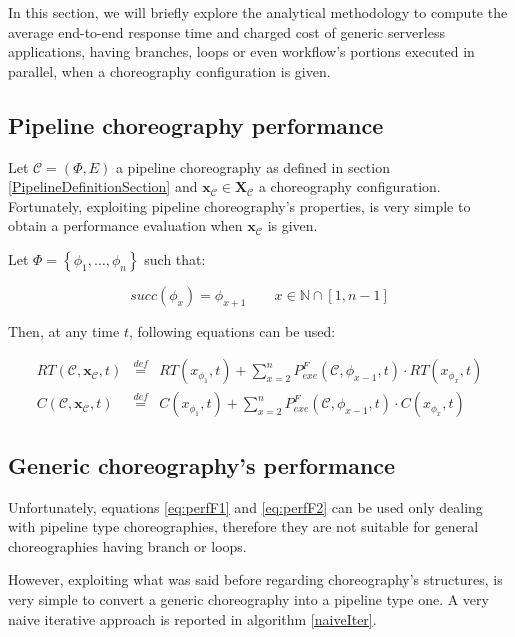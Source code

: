\documentclass[12pt,a4paper]{report}
\newcommand{\mathDef}{\overset{\textit{def}}{=}}
\newcommand{\N}{\mathbb{N}}
\newcommand{\SetFromOneTo}[1]{\N \cap \left[1,#1\right]}
\begin{document}
In this section, we will briefly explore the analytical methodology to compute the average end-to-end response time and charged cost of generic serverless applications, having branches, loops or even workflow's portions executed in parallel, when a choreography configuration is given.

\subsection{Pipeline choreography performance}

Let $\mathcal{C} = (\Phi,E)$ a pipeline choreography as defined in section \ref{PipelineDefinitionSection} and $\textbf{x}_{\mathcal{C}} \in \textbf{X}_{\mathcal{C}}$ a choreography configuration. Fortunately, exploiting pipeline choreography's properties, is very simple to obtain a performance evaluation when $\textbf{x}_{\mathcal{C}}$ is given. 

Let $\Phi = \left\{\phi_1, \ldots, \phi_n \right\}$ such that:

\begin{equation}
	succ(\phi_x) = \phi_{x+1}  \qquad x \in \SetFromOneTo{n -1}
\end{equation}


Then, at any time $t$, following equations can be used:

\begin{eqnarray}
	RT(\mathcal{C},\textbf{x}_{\mathcal{C}}, t) & \mathDef &  RT(x_{\phi_1},t) + \sum_{x = 2}^n P_{exe}^F(\mathcal{C},\phi_{x-1},t) \cdot RT(x_{\phi_x},t) \label{eq:perfF1} \\
	C(\mathcal{C},\textbf{x}_{\mathcal{C}}, t) & \mathDef &  C(x_{\phi_1},t) + \sum_{x = 2}^n P_{exe}^F(\mathcal{C},\phi_{x-1},t) \cdot C(x_{\phi_x},t) \label{eq:perfF2}
\end{eqnarray}

\subsection{Generic choreography's performance}

Unfortunately, equations \ref{eq:perfF1} and \ref{eq:perfF2} can be used only dealing with pipeline type choreographies, therefore they are not suitable for general choreographies having branch or loops. 

However, exploiting what was said before regarding choreography's structures, is very simple to convert a generic choreography into a pipeline type one. A very naive iterative approach is reported in algorithm \ref{naiveIter}.
\end{document}
